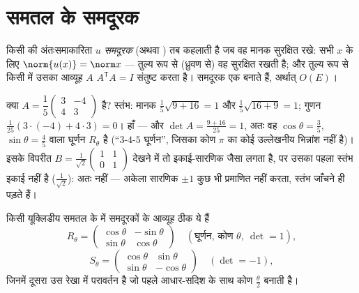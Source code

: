 \section{समतल के समदूरक}

\begin{definition}\label{def:b1:euclid:isometry}
किसी  की अंतःसमाकारिता $u$ \emph{समदूरक} (अथवा
 ) तब कहलाती है जब वह मानक सुरक्षित रखे: सभी $x$ के लिए
$\norm{u(x)} = \norm x$ --- तुल्य रूप से (ध्रुवण से) वह  सुरक्षित
रखती है; और तुल्य रूप से किसी   में उसका आव्यूह $A$
$A^{\mathsf T} A = I$ संतुष्ट करता है। समदूरक एक  बनाते हैं, अर्थात्
  $O(E)$।
\end{definition}

\begin{example}
\label{ex:b1:euclid:recognize}
क्या $A = \dfrac15\begin{pmatrix} 3 & -4\\ 4 & 3\end{pmatrix}$  है?
स्तंभ: मानक $\frac15\sqrt{9 + 16} = 1$ और $\frac15\sqrt{16 + 9} = 1$; गुणन
$\frac1{25}(3\cdot(-4) + 4\cdot3) = 0$। हाँ --- और $\det A = \frac{9 +
16}{25} = 1$, अतः वह $\cos\theta = \frac35$, $\sin\theta = \frac45$ वाला
घूर्णन $R_\theta$ है (``$3$-$4$-$5$ घूर्णन'', जिसका कोण $\pi$ का कोई
उल्लेखनीय भिन्नांश नहीं है)। इसके विपरीत $B =
\frac{1}{\sqrt2}\begin{pmatrix} 1 & 1\\ 0 & 1\end{pmatrix}$ देखने में तो
इकाई-सारणिक जैसा लगता है, पर उसका पहला स्तंभ इकाई नहीं है
($\frac1{\sqrt2}$): अतः  नहीं --- अकेला सारणिक $\pm1$ कुछ भी प्रमाणित
नहीं करता, स्तंभ जाँचने ही पड़ते हैं।
\end{example}

\begin{theorem}\label{thm:b1:euclid:plane}
किसी यूक्लिडीय समतल के   में समदूरकों के आव्यूह ठीक ये
हैं
\[
R_\theta = \begin{pmatrix}
\cos\theta & -\sin\theta\\ \sin\theta & \cos\theta
\end{pmatrix}
\quad (\text{घूर्णन, कोण } \theta,\ \det = 1),
\]
\[
S_\theta = \begin{pmatrix}
\cos\theta & \sin\theta\\ \sin\theta & -\cos\theta
\end{pmatrix}
\quad (\det = -1),
\]
जिनमें दूसरा उस रेखा में परावर्तन है जो पहले आधार-सदिश के साथ कोण
$\frac\theta2$ बनाती है।
\end{theorem}

